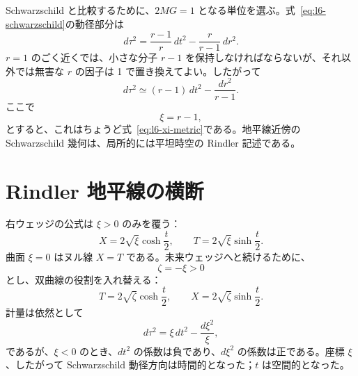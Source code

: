 Schwarzschild と比較するために、\(2MG=1\) となる単位を選ぶ。式~\eqref{eq:l6-schwarzschild}の動径部分は
\begin{equation}
d\tau^{2}
=
\frac{r-1}{r}\,dt^{2}
-
\frac{r}{r-1}\,dr^{2}.
\end{equation}
\(r=1\) のごく近くでは、小さな分子 \(r-1\) を保持しなければならないが、それ以外では無害な \(r\) の因子は 1 で置き換えてよい。したがって
\begin{equation}
d\tau^{2}
\simeq
(r-1)\,dt^{2}
-
\frac{dr^{2}}{r-1}.
\end{equation}
ここで
\begin{equation}
\xi=r-1,
\end{equation}
とすると、これはちょうど式~\eqref{eq:l6-xi-metric}である。地平線近傍の Schwarzschild
幾何は、局所的には平坦時空の Rindler 記述である。

\begin{classroomqa}
\end{classroomqa}

\section{Rindler 地平線の横断}

右ウェッジの公式は \(\xi>0\) のみを覆う：
\begin{equation}
X=2\sqrt{\xi}\cosh\frac{t}{2},
\qquad
T=2\sqrt{\xi}\sinh\frac{t}{2}.
\label{eq:l6-rindler-outside}
\end{equation}
曲面 \(\xi=0\) はヌル線 \(X=T\) である。未来ウェッジへと続けるために、
\begin{equation}
\zeta=-\xi>0
\end{equation}
とし、双曲線の役割を入れ替える：
\begin{equation}
T=2\sqrt{\zeta}\cosh\frac{t}{2},
\qquad
X=2\sqrt{\zeta}\sinh\frac{t}{2}.
\label{eq:l6-rindler-inside}
\end{equation}
計量は依然として
\begin{equation}
d\tau^{2}
=\xi\,dt^{2}-\frac{d\xi^{2}}{\xi},
\end{equation}
であるが、\(\xi<0\) のとき、\(dt^{2}\) の係数は負であり、\(d\xi^{2}\) の係数は正である。座標 \(\xi\)、したがって
Schwarzschild 動径方向は時間的となった；\(t\) は空間的となった。

